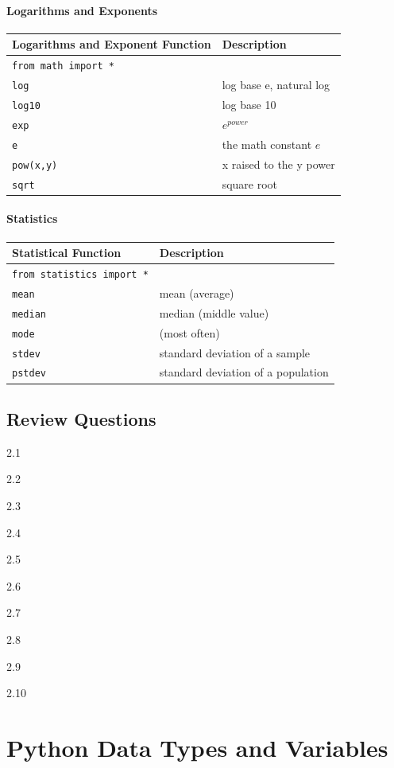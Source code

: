 \documentclass{book}
\begin{document}
\subsubsection{Logarithms and Exponents}\label{logarithms-and-exponents}

\begin{longtable}[]{@{}ll@{}}
\toprule
Logarithms and Exponent Function & Description\tabularnewline
\midrule
\endhead
\lstinline!from math import *! &\tabularnewline
\lstinline!log! & log base e, natural log\tabularnewline
\lstinline!log10! & log base 10\tabularnewline
\lstinline!exp! & \(e^{power}\)\tabularnewline
\lstinline!e! & the math constant \(e\)\tabularnewline
\lstinline!pow(x,y)! & x raised to the y power\tabularnewline
\lstinline!sqrt! & square root\tabularnewline
\bottomrule
\end{longtable}

\subsubsection{Statistics}\label{statistics}

\begin{longtable}[]{@{}ll@{}}
\toprule
Statistical Function & Description\tabularnewline
\midrule
\endhead
\lstinline!from statistics import *! &\tabularnewline
\lstinline!mean! & mean (average)\tabularnewline
\lstinline!median! & median (middle value)\tabularnewline
\lstinline!mode! & (most often)\tabularnewline
\lstinline!stdev! & standard deviation of a sample\tabularnewline
\lstinline!pstdev! & standard deviation of a population\tabularnewline
\bottomrule
\end{longtable}

    \section{Review Questions}\label{review-questions}

    2.1

2.2

2.3

2.4

2.5

2.6

2.7

2.8

2.9

2.10

    \chapter{Python Data Types and
Variables}\label{python-data-types-and-variables}
\end{document}
